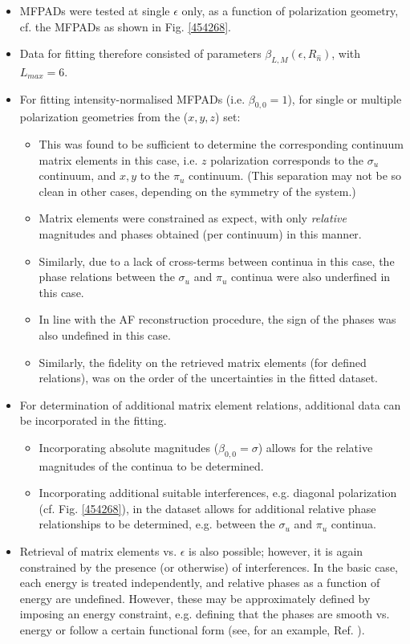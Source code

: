 \begin{itemize}
\item MFPADs were tested at single $\epsilon$ only, as a function of polarization geometry, cf. the MFPADs as shown in Fig. \ref{454268}.
\item Data for fitting therefore consisted of parameters $\beta_{L,M}(\epsilon,R_{\hat{n}})$, with $L_{max}=6$.
\item For fitting intensity-normalised MFPADs (i.e. $\beta_{0,0}=1$), for single or multiple polarization geometries from the ($x,y,z$) set:
\begin{itemize}
\item This was found to be sufficient to determine the corresponding continuum matrix elements in this case, i.e. $z$ polarization corresponds to the $\sigma_u$ continuum, and $x,y$ to the $\pi_u$ continuum. (This separation may not be so clean in other cases, depending on the symmetry of the system.)
\item Matrix elements were constrained as expect, with only \textit{relative} magnitudes and phases obtained (per continuum) in this manner.
\item Similarly, due to a lack of cross-terms between continua in this case, the phase relations between the $\sigma_u$ and $\pi_u$ continua were also underfined in this case.
\item In line with the AF reconstruction procedure, the sign of the phases was also undefined in this case.
\item Similarly, the fidelity on the retrieved matrix elements (for defined relations), was on the order of the uncertainties in the fitted dataset.
\end{itemize}
\item For determination of additional matrix element relations, additional data can be incorporated in the fitting.
\begin{itemize}
\item Incorporating absolute magnitudes ($\beta_{0,0}=\sigma$) allows for the relative magnitudes of the continua to be determined.
\item Incorporating additional suitable interferences, e.g. diagonal polarization (cf. Fig. \ref{454268}), in the dataset allows for additional relative phase relationships to be determined, e.g. between the $\sigma_u$ and $\pi_u$ continua.
\end{itemize}
\item Retrieval of matrix elements vs. $\epsilon$ is also possible; however, it is again constrained by the presence (or otherwise) of interferences. In the basic case, each energy is treated independently, and relative phases as a function of energy are undefined. However, these may be approximately defined by imposing an energy constraint, e.g. defining that the phases are smooth vs. energy or follow a certain functional form (see, for an example, Ref. \cite{Yagishita2005}). %
\end{itemize}


